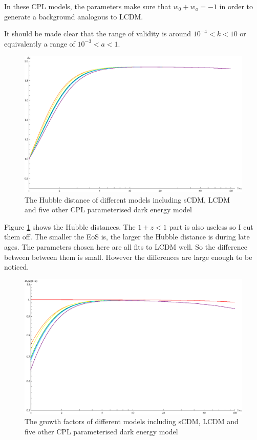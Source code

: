 \documentclass{article}
\begin{document}
In these CPL models, the parameters make sure that $w_0+w_a=-1$ in order to generate a background analogous to LCDM.

It should be made clear that the range of validity is around $10^{-4}<k<10$ or equivalently a range of $10^{-3}<a<1$.




\begin{figure}[!htbp]
\centering
\includegraphics[width=400pt]{CPL_HubbleDistances.eps}
\caption{The Hubble distance of different models including sCDM, LCDM and five other CPL parameterised dark energy model}\label{fig:CPL_HubbleDistances}
\end{figure}

Figure \ref{fig:CPL_HubbleDistances}  shows the Hubble distances. The $1+z<1$ part is also useless so I cut them off. The smaller the EoS is, the larger the Hubble distance is during late ages. The parameters chosen here are all fits to LCDM well. So the difference between between them is small. However the differences are large enough to be noticed.



\begin{figure}[!htbp]
\centering
\includegraphics[width=400pt]{CPL_GrowthFactors.eps}
\caption{The growth factors of different models including sCDM, LCDM and five other CPL parameterised dark energy model}\label{fig:CPL_GrowthFactors}
\end{figure}
\end{document}
